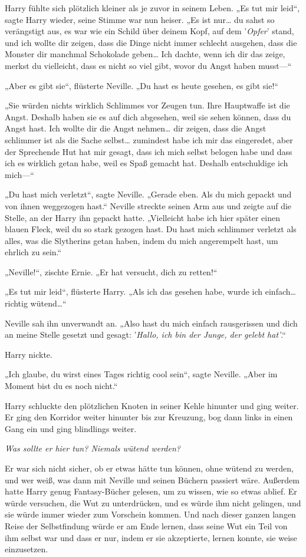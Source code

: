 {Harry fühlte sich plötzlich kleiner als je zuvor in seinem Leben. „Es tut mir leid“, sagte Harry wieder, seine Stimme war nun heiser. „Es ist nur… du sahst so verängstigt aus, es war wie ein Schild über deinem Kopf, auf dem '\emph{Opfer}' stand, und ich wollte dir zeigen, dass die Dinge nicht immer schlecht ausgehen, dass die Monster dir manchmal Schokolade geben… Ich dachte, wenn ich dir das zeige, merkst du vielleicht, dass es nicht so viel gibt, wovor du Angst haben musst—“

„Aber es gibt sie“, flüsterte Neville. „Du hast es heute gesehen, es gibt sie!“

„Sie würden nichts wirklich Schlimmes vor Zeugen tun. Ihre Hauptwaffe ist die Angst. Deshalb haben sie es auf dich abgesehen, weil sie sehen können, dass du Angst hast. Ich wollte dir die Angst nehmen… dir zeigen, dass die Angst schlimmer ist als die Sache selbst… zumindest habe ich mir das eingeredet, aber der Sprechende Hut hat mir gesagt, dass ich mich selbst belogen habe und dass ich es wirklich getan habe, weil es Spaß gemacht hat. Deshalb entschuldige ich mich—“

„Du hast mich verletzt“, sagte Neville. „Gerade eben. Als du mich gepackt und von ihnen weggezogen hast.“ Neville streckte seinen Arm aus und zeigte auf die Stelle, an der Harry ihn gepackt hatte. „Vielleicht habe ich hier später einen blauen Fleck, weil du so stark gezogen hast. Du hast mich schlimmer verletzt als alles, was die Slytherins getan haben, indem du mich angerempelt hast, um ehrlich zu sein.“

„Neville!“, zischte Ernie. „Er hat versucht, dich zu retten!“

„Es tut mir leid“, flüsterte Harry. „Als ich das gesehen habe, wurde ich einfach…richtig wütend…“

Neville sah ihn unverwandt an. „Also hast du mich einfach rausgerissen und dich an meine Stelle gesetzt und gesagt: '\emph{Hallo, ich bin der Junge, der gelebt hat'}.“

Harry nickte.

„Ich glaube, du wirst eines Tages richtig cool sein“, sagte Neville. „Aber im Moment bist du es noch nicht.“

Harry schluckte den plötzlichen Knoten in seiner Kehle hinunter und ging weiter. Er ging den Korridor weiter hinunter bis zur Kreuzung, bog dann links in einen Gang ein und ging blindlings weiter.

\emph{Was sollte er hier tun? Niemals wütend werden?}

Er war sich nicht sicher, ob er etwas hätte tun können, ohne wütend zu werden, und wer weiß, was dann mit Neville und seinen Büchern passiert wäre. Außerdem hatte Harry genug Fantasy-Bücher gelesen, um zu wissen, wie so etwas ablief. Er würde versuchen, die Wut zu unterdrücken, und es würde ihm nicht gelingen, und sie würde immer wieder zum Vorschein kommen. Und nach dieser ganzen langen Reise der Selbstfindung würde er am Ende lernen, dass seine Wut ein Teil von ihm selbst war und dass er nur, indem er sie akzeptierte, lernen konnte, sie weise einzusetzen.

}
